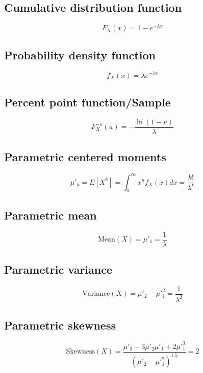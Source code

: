 \documentclass{article}
\begin{document}
\subsection{Cumulative distribution function}
\begin{equation*} F_{X}\left(x\right)=1-e^{-\lambda x} \end{equation*}
\subsection{Probability density function}
\begin{equation*} f_{X}\left(x\right)=\lambda e^{-\lambda x} \end{equation*}
\subsection{Percent point function/Sample}
\begin{equation*} F^{-1}_{X}\left(u\right)=-\frac{\ln(1-u)}{\lambda} \end{equation*}
\subsection{Parametric centered moments}
\begin{equation*} \mu'_{k}=E[X^k]=\int_{0}^{\infty}x^{n}f_{X}\left(x\right)dx=\frac{k!}{\lambda^{k}} \end{equation*}
\subsection{Parametric mean}
\begin{equation*} \mathrm{Mean}(X)=\mu'_{1}=\frac{1}{\lambda} \end{equation*}
\subsection{Parametric variance}
\begin{equation*} \mathrm{Variance}(X)=\mu'_{2}-\mu'^{2}_{1}=\frac{1}{\lambda^2} \end{equation*}
\subsection{Parametric skewness}
\begin{equation*} \mathrm{Skewness}(X)=\frac{\mu'_{3}-3\mu'_{2}\mu'_{1}+2\mu'^{3}_{1}}{(\mu'_{2}-\mu'^{2}_{1})^{1.5}}=2 \end{equation*}
\end{document}
